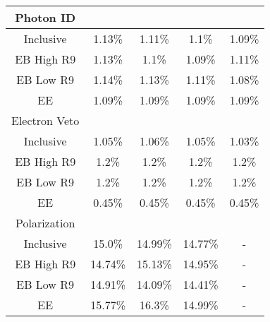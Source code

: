 \begin{tabular}{c|c|c|c|c}
\hline\hline
Photon ID  & \multicolumn{4}{l}{} \\ \hline
Inclusive & 1.13\% & 1.11\% & 1.1\% & 1.09\% \\
EB High R9 & 1.13\% & 1.1\% & 1.09\% & 1.11\% \\
EB Low R9 & 1.14\% & 1.13\% & 1.11\% & 1.08\% \\
EE & 1.09\% & 1.09\% & 1.09\% & 1.09\% \\
\hline\hline
Electron Veto  & \multicolumn{4}{l}{} \\ \hline
Inclusive & 1.05\% & 1.06\% & 1.05\% & 1.03\% \\
EB High R9 & 1.2\% & 1.2\% & 1.2\% & 1.2\% \\
EB Low R9 & 1.2\% & 1.2\% & 1.2\% & 1.2\% \\
EE & 0.45\% & 0.45\% & 0.45\% & 0.45\% \\
\hline\hline
Polarization  & \multicolumn{4}{l}{} \\ \hline
Inclusive & 15.0\% & 14.99\% & 14.77\% & - \\
EB High R9 & 14.74\% & 15.13\% & 14.95\% & - \\
EB Low R9 & 14.91\% & 14.09\% & 14.41\% & - \\
EE & 15.77\% & 16.3\% & 14.99\% & - \\
\hline\hline

\end{tabular}


